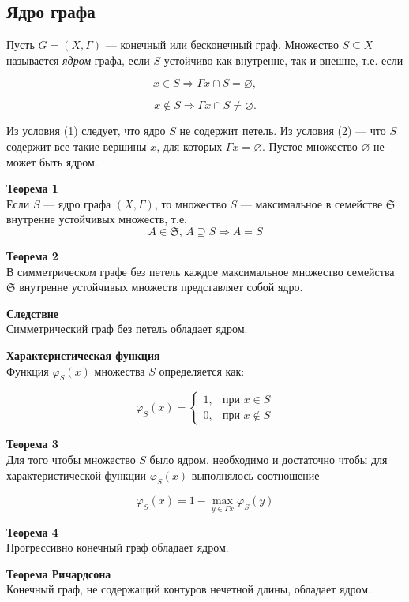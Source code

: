 \subsection{Ядро графа}
Пусть $G = (X, \Gamma)$ — конечный или бесконечный граф. Множество $S \subseteq X$ называется \textit{ядром} графа, если $S$ устойчиво как внутренне, так и внешне, т.е. если

\begin{equation}
x \in S \Rightarrow \Gamma x \cap S = \varnothing,
\end{equation}

\begin{equation}
x \notin S \Rightarrow \Gamma x \cap S \neq \varnothing.
\end{equation}

Из условия (1) следует, что ядро $S$ не содержит петель. Из условия (2) — что $S$ содержит все такие вершины $x$, для которых $\Gamma x = \varnothing$. Пустое множество $\varnothing$ не может быть ядром.

\textbf{Теорема 1} \\
Если $S$ — ядро графа $(X, \Gamma)$, то множество $S$ — максимальное в семействе $\mathfrak{S}$ внутренне устойчивых множеств, т.е.
\[
A \in \mathfrak{S}, \, A \supseteq S \Rightarrow A = S
\]

\textbf{Теорема 2} \\
В симметрическом графе без петель каждое максимальное множество семейства $\mathfrak{S}$ внутренне устойчивых множеств представляет собой ядро.

\textbf{Следствие} \\
Симметрический граф без петель обладает ядром.

\textbf{Характеристическая функция} \\
Функция $\varphi_S(x)$ множества $S$ определяется как:

\[
\varphi_S(x) = 
\begin{cases} 
1, & \text{при } x \in S \\ 
0, & \text{при } x \notin S 
\end{cases}
\]

\textbf{Теорема 3} \\
Для того чтобы множество $S$ было ядром, необходимо и достаточно чтобы для характеристической функции $\varphi_S(x)$ выполнялось соотношение

\[
\varphi_S(x) = 1 - \max_{y \in \Gamma x} \varphi_S(y)
\]

\textbf{Теорема 4} \\
Прогрессивно конечный граф обладает ядром.

\textbf{Теорема Ричардсона} \\
Конечный граф, не содержащий контуров нечетной длины, обладает ядром.

